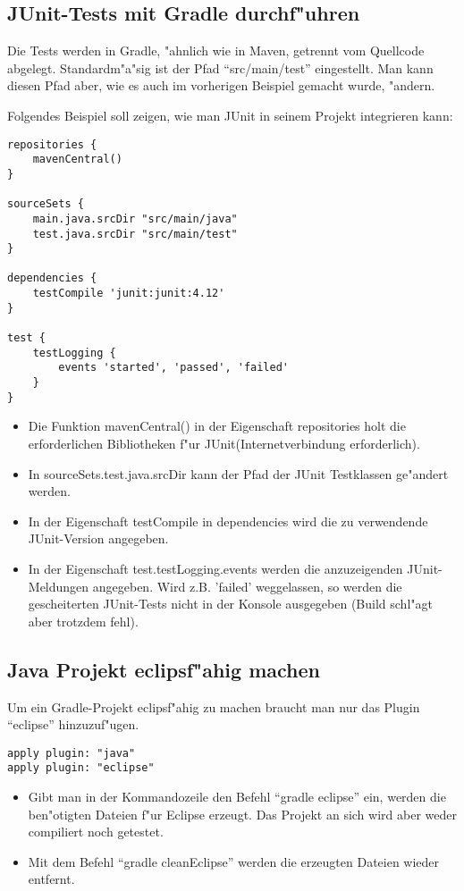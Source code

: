 \subsection{JUnit-Tests mit Gradle durchf"uhren}
Die Tests werden in Gradle, "ahnlich wie in Maven, getrennt vom Quellcode abgelegt. Standardm"a"sig ist der Pfad ``src/main/test'' eingestellt. Man kann diesen Pfad aber, wie es auch im vorherigen Beispiel gemacht wurde, "andern.

Folgendes Beispiel soll zeigen, wie man JUnit in seinem Projekt integrieren kann:
\begin{verbatim}
repositories {
    mavenCentral()
}

sourceSets {
    main.java.srcDir "src/main/java"
    test.java.srcDir "src/main/test"
}

dependencies {
    testCompile 'junit:junit:4.12'
}

test {
    testLogging {
        events 'started', 'passed', 'failed'
    }
}
\end{verbatim}
\begin{itemize}
\item Die Funktion mavenCentral() in der Eigenschaft repositories holt die erforderlichen Bibliotheken f"ur JUnit(Internetverbindung erforderlich).
\item In sourceSets.test.java.srcDir kann der Pfad der JUnit Testklassen ge"andert werden.
\item In der Eigenschaft testCompile in dependencies wird die zu verwendende JUnit-Version angegeben.
\item In der Eigenschaft test.testLogging.events werden die anzuzeigenden JUnit-Meldungen angegeben. Wird z.B. 'failed' weggelassen, so werden die gescheiterten JUnit-Tests nicht in der Konsole ausgegeben (Build schl"agt aber trotzdem fehl).
\end{itemize}

\subsection{Java Projekt eclipsf"ahig machen}
Um ein Gradle-Projekt eclipsf"ahig zu machen braucht man nur das Plugin ``eclipse'' hinzuzuf"ugen.
\begin{verbatim}
apply plugin: "java"
apply plugin: "eclipse"
\end{verbatim}

\begin{itemize}
\item Gibt man in der Kommandozeile den Befehl ``gradle eclipse'' ein, werden die ben"otigten Dateien f"ur Eclipse erzeugt. Das Projekt an sich wird aber weder compiliert noch getestet.
\item Mit dem Befehl ``gradle cleanEclipse'' werden die erzeugten Dateien wieder entfernt.
\end{itemize}
